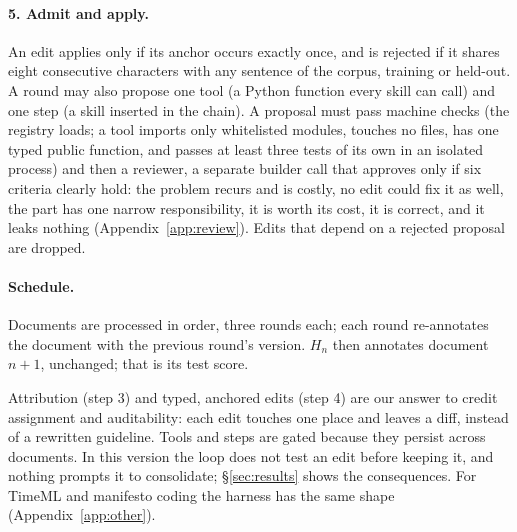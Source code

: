 \paragraph{5. Admit and apply.} An edit applies only if its anchor occurs exactly once, and is rejected if it shares eight consecutive characters with any sentence of the corpus, training or held-out. A round may also propose one tool (a Python function every skill can call) and one step (a skill inserted in the chain). A proposal must pass machine checks (the registry loads; a tool imports only whitelisted modules, touches no files, has one typed public function, and passes at least three tests of its own in an isolated process) and then a reviewer, a separate builder call that approves only if six criteria clearly hold: the problem recurs and is costly, no edit could fix it as well, the part has one narrow responsibility, it is worth its cost, it is correct, and it leaks nothing (Appendix~\ref{app:review}). Edits that depend on a rejected proposal are dropped.

\paragraph{Schedule.} Documents are processed in order, three rounds each; each round re-annotates the document with the previous round's version. $H_n$ then annotates document $n{+}1$, unchanged; that is its test score.

Attribution (step 3) and typed, anchored edits (step 4) are our answer to credit assignment and auditability: each edit touches one place and leaves a diff, instead of a rewritten guideline. Tools and steps are gated because they persist across documents. In this version the loop does not test an edit before keeping it, and nothing prompts it to consolidate; \S\ref{sec:results} shows the consequences. For TimeML and manifesto coding the harness has the same shape (Appendix~\ref{app:other}).
